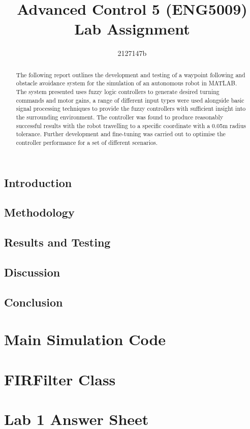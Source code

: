 \documentclass[11pt]{article}
\begin{document}
\title{Advanced Control 5 (ENG5009) \\ \large{Lab Assignment}}
\author{2127147b}
\maketitle

\begin{abstract}
    The following report outlines the development and testing of a waypoint following and obstacle avoidance system for the simulation of an autonomous robot in MATLAB.
    The system presented uses fuzzy logic controllers to generate desired turning commands and motor gains, a range of different input types were used alongside basic signal processing techniques to provide the fuzzy controllers with sufficient insight into the surrounding environment.
    The controller was found to produce reasonably successful results with the robot travelling to a specific coordinate with a 0.05m radius tolerance. 
    Further development and fine-tuning was carried out to optimise the controller performance for a set of different scenarios. 
    \end{abstract}

\section{Introduction}

\section{Methodology}

\section{Results and Testing}

\section{Discussion}

\section{Conclusion}

\pagebreak



\appendix
\chapter{Main Simulation Code}

\chapter{FIRFilter Class}

\chapter{Lab 1 Answer Sheet}
\end{document}
